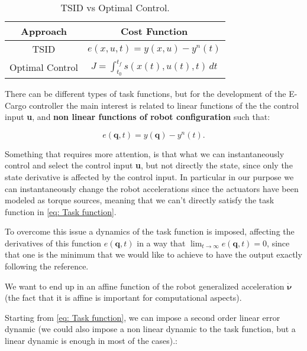 \begin{table}[h]
    \centering
    \caption{TSID vs Optimal Control.}
    \label{tab:list_of_symbols}
    \renewcommand{\arraystretch}{1.5} %
    \begin{tabular}{c c}
    \toprule
    \textbf{Approach} & \textbf{Cost Function} \\
    \midrule
    TSID & $e(x,u,t) = y(x,u) -y^{n}(t) $\\
    \hline
    Optimal Control & $ J = \int_{t_0}^{t_f} s(x(t), u(t), t) \, dt $\\
    \bottomrule
    \end{tabular}
\end{table}

There can be different types of task functions, but for the development of the E-Cargo controller the main interest is related to linear functions of the the control input \textbf{u}, and \textbf{non linear functions of robot configuration} such that:

    \begin{equation}
         e(\mathbf{q},t) = y(\mathbf{q}) - y^{n}(t).
         \label{eq: Task function}
    \end{equation}

Something that requires more attention, is that what we can instantaneously control and select the control input \textbf{u}, but not directly the state, since only the state derivative is affected by the control input.
In particular in our purpose we can instantaneously change the robot accelerations since the actuators have been modeled as torque sources, meaning that we can't directly satisfy the task function in \eqref{eq: Task function}.

To overcome this issue a dynamics of the task function is imposed, affecting the derivatives of this function $e(\mathbf{q},t)$ in a way that $\lim_{t \to \infty} e(\mathbf{q},t) = 0$, since that one is the minimum that we would like to achieve to have the output exactly following the reference.

We want to end up in an affine function of the robot generalized acceleration $\dot{\bm{\nu}}$ (the fact that it is affine is important for computational aspects).

Starting from \eqref{eq: Task function}, we can impose a second order linear error dynamic (we could also impose a non linear dynamic to the task function, but a linear dynamic is enough in most of the cases).:

